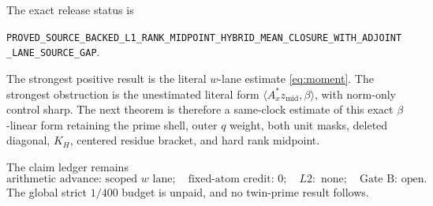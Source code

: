 \documentclass[10pt]{article}
\newcommand{\ip}[2]{\langle #1,#2\rangle}
\newcommand{\zm}{z_{\mathrm{mid}}}
\newcommand{\Ax}{A_x}
\begin{document}
The exact release status is
\begin{center}
\footnotesize\nolinkurl{PROVED_SOURCE_BACKED_L1_RANK_MIDPOINT_HYBRID_MEAN_CLOSURE_WITH_ADJOINT_LANE_SOURCE_GAP}.
\end{center}
The strongest positive result is the literal $w$-lane estimate
\eqref{eq:moment}.  The strongest obstruction is the unestimated literal
form $\ip{\Ax^*\zm}\beta$, with norm-only control sharp.  The next theorem is
therefore a same-clock estimate of this exact $\beta$-linear form retaining
the prime shell, outer $q$ weight, both unit masks, deleted diagonal,
$K_H$, centered residue bracket, and hard rank midpoint.

The claim ledger remains
\[
 \text{arithmetic advance: scoped $w$ lane};\quad
 \text{fixed-atom credit: }0;\quad L2:\text{ none};\quad
 \text{Gate B: open}.
\]
The global strict $1/400$ budget is unpaid, and no twin-prime result follows.



\end{document}
